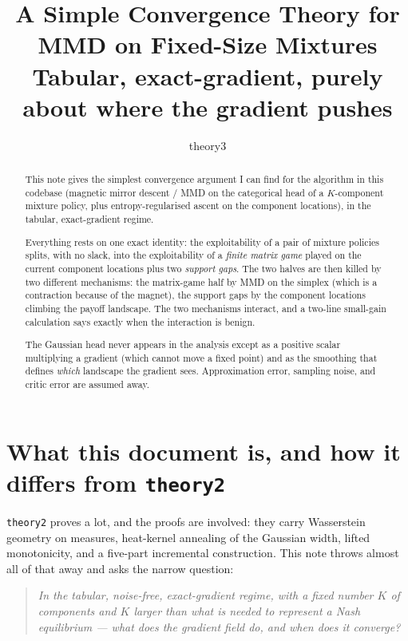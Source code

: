 \documentclass[11pt,a4paper]{article}
\title{\textbf{A Simple Convergence Theory for MMD on Fixed-Size Mixtures}\\[4pt]
\large Tabular, exact-gradient, purely about where the gradient pushes}
\author{theory3}
\date{}
\theoremstyle{plain}
\theoremstyle{definition}
\theoremstyle{remark}
\begin{document}
\maketitle

\begin{abstract}
This note gives the simplest convergence argument I can find for the algorithm in
this codebase (magnetic mirror descent / MMD on the categorical head of a
$K$-component mixture policy, plus entropy-regularised ascent on the component
locations), in the tabular, exact-gradient regime.

Everything rests on one exact identity: the exploitability of a pair of mixture
policies splits, with no slack, into the exploitability of a \emph{finite matrix
game} played on the current component locations plus two \emph{support gaps}.
The two halves are then killed by two different mechanisms: the matrix-game half
by MMD on the simplex (which is a contraction because of the magnet), the support
gaps by the component locations climbing the payoff landscape. The two mechanisms
interact, and a two-line small-gain calculation says exactly when the interaction
is benign.

The Gaussian head never appears in the analysis except as a positive scalar
multiplying a gradient (which cannot move a fixed point) and as the smoothing that
defines \emph{which} landscape the gradient sees. Approximation error, sampling
noise, and critic error are assumed away.
\end{abstract}

\tableofcontents

\newpage
\section{What this document is, and how it differs from \texttt{theory2}}

\texttt{theory2} proves a lot, and the proofs are involved: they carry
Wasserstein geometry on measures, heat-kernel annealing of the Gaussian width,
lifted monotonicity, and a five-part incremental construction. This note throws
almost all of that away and asks the narrow question:

\begin{quote}
\emph{In the tabular, noise-free, exact-gradient regime, with a fixed number $K$ of
components and $K$ larger than what is needed to represent a Nash equilibrium ---
what does the gradient field do, and when does it converge?}
\end{quote}
\end{document}
